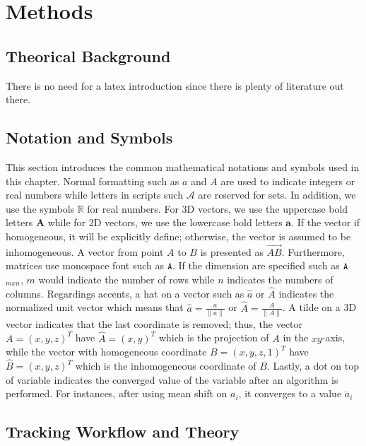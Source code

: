 \chapter{Methods}
\label{chapter:Methods}



 
\section{Theorical Background}
There is no need for a latex introduction since there is plenty of literature out there.
 

\section{Notation and Symbols}
This section introduces the common mathematical notations and symbols used in this 
chapter.
Normal formatting such as $a$ and $A$ are used to indicate integers or real numbers while letters in scripts such $\mathcal{A}$ are reserved for sets. In addition, 
we use the symbols $\mathbb{R}$ for real numbers.
For 3D vectors, we use the uppercase bold letters $\mathbf{A}$ while for 2D vectors, 
we use the lowercase bold letters $\mathbf{a}$. If the vector if homogeneous, it will
be explicitly define; otherwise, the vector is assumed to be inhomogeneous. A vector
from point $A$ to $B$ is presented as $\overrightarrow{AB}$. Furthermore, matrices use
monospace font such as $\mathtt{A}$. If the dimension are specified such as $\mathtt{A}$$_{mxn}$,
$m$ would indicate the number of rows while $n$ indicates the numbers of columns.
Regardings accents, a hat on a vector such as $\hat{a}$ or $\hat{A}$ indicates the normalized
unit vector which means that $\hat{a}=\frac{a}{\|a\|}$ or $\hat{A}=\frac{A}{\|A\|}$.
A tilde on a 3D vector indicates that the last coordinate is removed; thus, the vector 
$A=(x,y,z)^T$ have $\hat{A}=(x,y)^T$  which is the projection of $A$ in the $xy$-axis,
while the vector with homogeneous coordinate $B=(x,y,z,1)^T$ have $\hat{B}=(x,y,z)^T$ 
which is the inhomogeneous coordinate of $B$. Lastly, a dot on top of variable indicates
the converged value of the variable after an algorithm is performed. For instances,
after using mean shift on $a_i$, it converges to a value $\dot{a}_i$

\section{Tracking Workflow and Theory}

